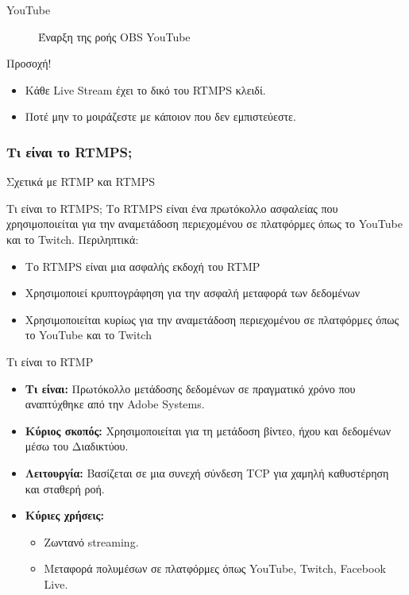 \documentclass[aspectratio=169]{beamer}
\begin{document}
\begin{frame}[allowframebreaks]{YouTube}
\begin{figure}
    \caption{Έναρξη της ροής OBS \rightarrow YouTube}
    \label{fig:obs2youtube}
  \end{figure}
\begin{alertblock}{Προσοχή!}
  \begin{itemize}
    \item Κάθε Live Stream έχει το δικό του RTMPS κλειδί.
    \item Ποτέ μην το μοιράζεστε με κάποιον που δεν εμπιστεύεστε.
  \end{itemize}
\end{alertblock}
\end{frame}
\subsubsection{Τι είναι το RTMPS;}
\begin{frame}[allowframebreaks]{Σχετικά με RTMP και RTMPS}
  \begin{exampleblock}{Τι είναι το RTMPS;}
    Το RTMPS είναι ένα πρωτόκολλο ασφαλείας που χρησιμοποιείται για την αναμετάδοση περιεχομένου σε πλατφόρμες όπως το YouTube και το Twitch.
    Περιληπτικά:
    \begin{itemize}
      \item Το RTMPS είναι μια ασφαλής εκδοχή του RTMP
      \item Χρησιμοποιεί κρυπτογράφηση για την ασφαλή μεταφορά των δεδομένων
      \item Χρησιμοποιείται κυρίως για την αναμετάδοση περιεχομένου σε πλατφόρμες όπως το YouTube και το Twitch
    \end{itemize}
  \end{exampleblock}
  \begin{exampleblock}{Τι είναι το RTMP}
    \begin{itemize}
      \item \textbf{Τι είναι:} Πρωτόκολλο μετάδοσης δεδομένων σε πραγματικό χρόνο που αναπτύχθηκε από την Adobe Systems.
      \item \textbf{Κύριος σκοπός:} Χρησιμοποιείται για τη μετάδοση βίντεο, ήχου και δεδομένων μέσω του Διαδικτύου.
      \item \textbf{Λειτουργία:} Βασίζεται σε μια συνεχή σύνδεση TCP για χαμηλή καθυστέρηση και σταθερή ροή.
      \item \textbf{Κύριες χρήσεις:} 
          \begin{itemize}
              \item Ζωντανό streaming.
              \item Μεταφορά πολυμέσων σε πλατφόρμες όπως YouTube, Twitch, Facebook Live.

\end{itemize}
\end{itemize}
\end{exampleblock}
\end{frame}
\end{document}
